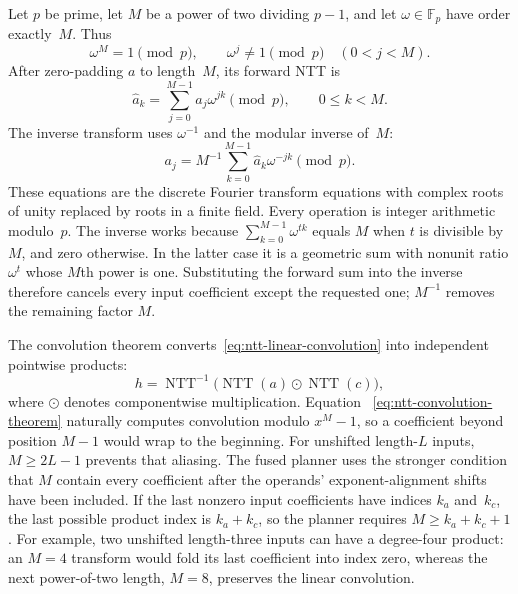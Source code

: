 Let $p$ be prime, let $M$ be a power of two dividing $p-1$, and let
$\omega\in\mathbb{F}_p$ have order exactly~$M$.  Thus
\begin{equation}
  \omega^M=1\pmod p,
  \qquad
  \omega^j\ne 1\pmod p\quad(0<j<M).
  \label{eq:ntt-primitive-root}
\end{equation}
After zero-padding $a$ to length~$M$, its forward NTT is
\begin{equation}
  \widehat a_k = \sum_{j=0}^{M-1} a_j\omega^{jk}\pmod p,
  \qquad 0\le k<M.
  \label{eq:ntt-forward-definition}
\end{equation}
The inverse transform uses $\omega^{-1}$ and the modular inverse of~$M$:
\begin{equation}
  a_j = M^{-1}\sum_{k=0}^{M-1}\widehat a_k\omega^{-jk}\pmod p.
  \label{eq:ntt-inverse-definition}
\end{equation}
These equations are the discrete Fourier transform equations with complex roots
of unity replaced by roots in a finite field.  Every operation is integer
arithmetic modulo~$p$.  The inverse works because
$\sum_{k=0}^{M-1}\omega^{tk}$ equals $M$ when $t$ is divisible by $M$,
and zero otherwise.  In the latter case it is a geometric sum with nonunit
ratio $\omega^t$ whose $M$th power is one.  Substituting the forward sum into
the inverse therefore cancels every input coefficient except the requested
one; $M^{-1}$ removes the remaining factor $M$.

The convolution theorem converts~\eqref{eq:ntt-linear-convolution} into
independent pointwise products:
\begin{equation}
  h = \operatorname{NTT}^{-1}
      \bigl(\operatorname{NTT}(a)\odot\operatorname{NTT}(c)\bigr),
  \label{eq:ntt-convolution-theorem}
\end{equation}
where $\odot$ denotes componentwise multiplication.  Equation
~\eqref{eq:ntt-convolution-theorem} naturally computes convolution modulo
$x^M-1$, so a coefficient beyond position $M-1$ would wrap to the beginning.
For unshifted length-$L$ inputs, $M\ge 2L-1$ prevents that aliasing.  The fused
planner uses the stronger condition that $M$ contain every coefficient after
the operands' exponent-alignment shifts have been included.  If the last
nonzero input coefficients have indices $k_a$ and~$k_c$, the last possible
product index is $k_a+k_c$, so the planner requires $M\ge k_a+k_c+1$.
For example, two unshifted length-three inputs can have a degree-four product:
an $M=4$ transform would fold its last coefficient into index zero, whereas
the next power-of-two length, $M=8$, preserves the linear convolution.


